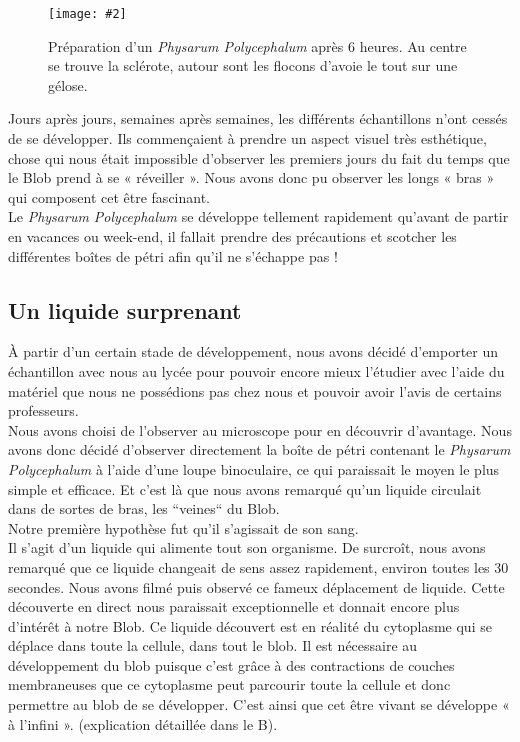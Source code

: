 \documentclass[]{report}
\newcommand{\includeimage}[2][]{%
\imgsrc{#2}
\begin{latexonly}
    \texttt{[image: \#2]}
\end{latexonly}
}
\theoremstyle{definition}
\begin{document}
\begin{figure}[H]
    \centering
    \includeimage[height=5cm]{physarum-polycephalum-debut.jpg}
    \caption{Préparation d'un \textit{Physarum Polycephalum} après 6 heures. Au centre se trouve la sclérote, autour sont les flocons d'avoie le tout sur une gélose.}
\end{figure}

{Jours après jours, semaines après semaines, les différents échantillons n’ont cessés de se développer. Ils commençaient à prendre un aspect visuel très esthétique, chose qui nous était impossible d’observer les premiers jours du fait du temps que le Blob prend à se « réveiller ». Nous avons donc pu observer les longs « bras » qui composent cet être fascinant.}\\
{Le \textit{Physarum Polycephalum} se développe tellement rapidement qu’avant de partir en vacances ou week-end, il fallait prendre des précautions et scotcher les différentes boîtes de pétri afin qu’il ne s’échappe pas !}

\subsection{Un liquide surprenant}

{À partir d’un certain stade de développement, nous avons décidé d’emporter un échantillon avec nous au lycée pour pouvoir encore mieux l’étudier avec l’aide du matériel que nous ne possédions pas chez nous et pouvoir avoir l’avis de certains professeurs.}\\
{Nous avons choisi de l’observer au microscope pour en découvrir d’avantage.  
Nous avons donc décidé d’observer directement la boîte de pétri contenant le \textit{Physarum Polycephalum} à l’aide d’une loupe binoculaire, ce qui paraissait le moyen le plus simple et efficace. Et c’est là que nous avons remarqué qu’un liquide circulait dans de sortes de bras, les “veines“ du Blob.}\\
{Notre première hypothèse fut qu’il s’agissait de son sang.}\\
{Il s’agit d’un liquide qui alimente tout son organisme. De surcroît, nous avons remarqué que ce liquide changeait de sens assez rapidement, environ toutes les 30 secondes. 
Nous avons filmé puis observé ce fameux déplacement de liquide. Cette découverte en direct nous paraissait exceptionnelle et donnait encore plus d’intérêt à notre Blob. 
Ce liquide découvert est en réalité du cytoplasme qui se déplace dans toute la cellule, dans tout le blob. Il est nécessaire au développement du blob puisque c’est grâce à des contractions de couches membraneuses que ce cytoplasme peut parcourir toute la cellule et donc permettre au blob de se développer. C’est ainsi que cet être vivant se développe « à l’infini ». (explication détaillée dans le B).}
\end{document}
